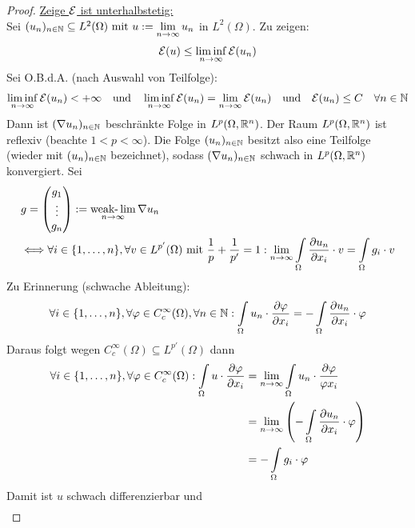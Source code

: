 \begin{beispiel}
\begin{proof}
\underline{Zeige $\mathcal{E}$ ist unterhalbstetig:}\\
Sei $(u_n)_{n\in\mathbb{N}}\subseteq L^2(\Omega)\text{ mit } u:=\lim\limits_{n\to\infty} u_n$ in $L^2(\Omega)$. Zu zeigen:
\begin{align*}
\mathcal{E}(u)\leq\liminf\limits_{n\to\infty}\mathcal{E}(u_n)
\end{align*}
Sei O.B.d.A. (nach Auswahl von Teilfolge):
\begin{align*}
\liminf\limits_{n\to\infty}\mathcal{E}(u_n)<+\infty
\quad\text{und}\quad
\liminf\limits_{n\to\infty}\mathcal{E}(u_n)=\lim\limits_{n\to\infty}\mathcal{E}(u_n)
\quad\text{und}\quad
\mathcal{E}(u_n)\leq C\quad\forall n\in\mathbb{N}
\end{align*}
Dann ist $(\nabla u_n)_{n\in\mathbb{N}}$ beschränkte Folge in $L^p(\Omega,\mathbb{R}^n)$. Der Raum $L^p(\Omega,\mathbb{R}^n)$ ist reflexiv (beachte $1<p<\infty$). Die Folge $(u_n)_{n\in\mathbb{N}}$ besitzt also eine Teilfolge (wieder mit $(u_n)_{n\in\mathbb{N}}$ bezeichnet), sodass $(\nabla u_n)_{n\in\mathbb{N}}$ schwach in $L^p(\Omega,\mathbb{R}^n)$ konvergiert. Sei
\begin{align*}
&g=\begin{pmatrix}
g_1\\ \vdots\\ g_n
\end{pmatrix}:=\operatorname*{\text{weak-}\lim}\limits_{n\to\infty}\nabla u_n\\
&\Longleftrightarrow\forall i\in\lbrace1,\ldots,n\rbrace,\forall v\in L^{p'}(\Omega)\text{ mit }\frac{1}{p}+\frac{1}{p'}=1:
\lim\limits_{n\to\infty}\int\limits_\Omega\frac{\partial u_n}{\partial x_i}\cdot v=\int\limits_\Omega g_i\cdot v
\end{align*}
Zu Erinnerung (schwache Ableitung):
\begin{align*}
\forall i\in\lbrace 1,\ldots,n\rbrace,\forall\varphi\in C_c^\infty(\Omega),\forall n\in\mathbb{N}:
\int\limits_\Omega u_n\cdot\frac{\partial\varphi}{\partial x_i}=-\int\limits_\Omega\frac{\partial u_n}{\partial x_i}\cdot\varphi
\end{align*}
Daraus folgt wegen $C_c^\infty(\Omega)\subseteq L^{p'}(\Omega)$ dann
\begin{align*}
\forall i\in\lbrace1,\ldots,n\rbrace,\forall\varphi\in C_c ^\infty(\Omega):
\int\limits_\Omega u\cdot\frac{\partial\varphi}{\partial x_i}
&=\lim\limits_{n\to\infty}\int\limits_\Omega u_n\cdot\frac{\partial\varphi}{\varphi x_i}\\
&=\lim\limits_{n\to\infty}\left(-\int\limits_\Omega\frac{\partial u_n}{\partial x_i}\cdot\varphi\right)\\
&=-\int\limits_\Omega g_i\cdot\varphi
\end{align*}
Damit ist $u$ schwach differenzierbar und 
\begin{align*}

\end{align*}
\end{proof}
\end{beispiel}
